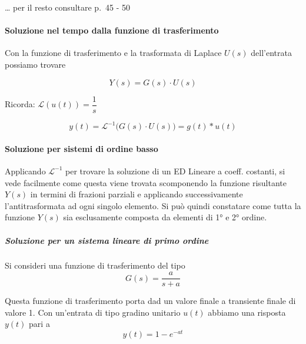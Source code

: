 \documentclass[11pt]{article}
\begin{document}
    \ldots{} per il resto consultare p.~45 - 50

    \hypertarget{soluzione-nel-tempo-dalla-funzione-di-trasferimento}{%
\paragraph{Soluzione nel tempo dalla funzione di
trasferimento}\label{soluzione-nel-tempo-dalla-funzione-di-trasferimento}}

Con la funzione di trasferimento e la trasformata di Laplace \(U(s)\)
dell'entrata possiamo trovare

\begin{equation}
Y(s) = G(s) \cdot U(s)
\end{equation}

    Ricorda: \(\mathcal{L}(u(t)) = \dfrac{1}{s}\)

    \begin{equation}
y(t) = \mathcal{L}^{-1}\big(G(s) \cdot U(s)\big) = g(t) * u(t)
\end{equation}

    \hypertarget{soluzione-per-sistemi-di-ordine-basso}{%
\paragraph{Soluzione per sistemi di ordine
basso}\label{soluzione-per-sistemi-di-ordine-basso}}

Applicando \(\mathcal{L}^{-1}\) per trovare la soluzione di un ED
Lineare a coeff. costanti, si vede facilmente come questa viene trovata
scomponendo la funzione risultante \(Y(s)\) in termini di frazioni
parziali e applicando successivamente l'antitrasformata ad ogni singolo
elemento. Si può quindi constatare come tutta la funzione \(Y(s)\) sia
esclusamente composta da elementi di 1° e 2° ordine.

\hypertarget{soluzione-per-un-sistema-lineare-di-primo-ordine}{%
\subparagraph{Soluzione per un sistema lineare di primo
ordine}\label{soluzione-per-un-sistema-lineare-di-primo-ordine}}

Si consideri una funzione di trasferimento del tipo \begin{equation}
    G(s) = \frac{a}{s+a}
\end{equation}

    Questa funzione di trasferimento porta dad un valore finale a transiente
finale di valore 1. Con un'entrata di tipo gradino unitario \(u(t)\)
abbiamo una risposta \(y(t)\) pari a\\
\begin{equation}
    y(t) = 1-e^{-at}
\end{equation}
\end{document}
